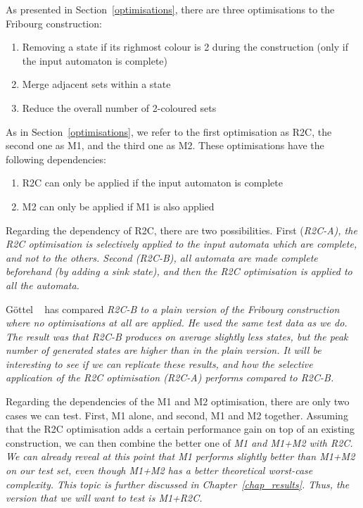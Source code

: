 As presented in Section~\ref{optimisations}, there are three optimisations to the Fribourg construction:
\begin{enumerate}
\item Removing a state if its righmost colour is 2 during the construction (only if the input automaton is complete)
\item Merge adjacent sets within a state
\item Reduce the overall number of 2-coloured sets
\end{enumerate}

As in Section~\ref{optimisations}, we refer to the first optimisation as R2C, the second one as M1, and the third one as M2. These optimisations have the following dependencies:
\begin{enumerate}
\item R2C can only be applied if the input automaton is complete
\item M2 can only be applied if M1 is also applied
\end{enumerate}

Regarding the dependency of R2C, there are two possibilities. First (\em{R2C-A}), the R2C optimisation is selectively applied to the input automata which are complete, and not to the others. Second (\em{R2C-B}), all automata are made complete beforehand (by adding a sink state), and then the R2C optimisation is applied to all the automata.

Göttel ~\cite{2013_bsc_goettel} has compared \em{R2C-B} to a plain version of the Fribourg construction where no optimisations at all are applied. He used the same test data as we do. The result was that \em{R2C-B} produces on average slightly less states, but the peak number of generated states are higher than in the plain version. It will be interesting to see if we can replicate these results, and how the selective application of the R2C optimisation (\em{R2C-A}) performs compared to \em{R2C-B}.

Regarding the dependencies of the M1 and M2 optimisation, there are only two cases we can test. First, M1 alone, and second, M1 and M2 together. Assuming that the R2C optimisation adds a certain performance gain on top of an existing construction, we can then combine the better one of \em{M1} and \em{M1+M2} with R2C. We can already reveal at this point that \em{M1} performs slightly better than \em{M1+M2} on our test set, even though \em{M1+M2} has a better theoretical worst-case complexity. This topic is further discussed in Chapter~\ref{chap_results}. Thus, the version that we will want to test is \em{M1+R2C}.

